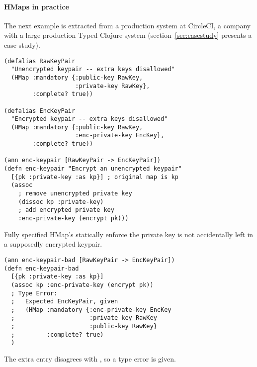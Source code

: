 \paragraph{HMaps in practice} The next example is extracted from a production system at CircleCI,
a company with a large production Typed Clojure system
(section~\ref{sec:casestudy} presents a case study).

\begin{verbatim}
(defalias RawKeyPair
  "Unencrypted keypair -- extra keys disallowed"
  (HMap :mandatory {:public-key RawKey,
                    :private-key RawKey},
        :complete? true))

(defalias EncKeyPair
  "Encrypted keypair -- extra keys disallowed"
  (HMap :mandatory {:public-key RawKey,
                    :enc-private-key EncKey},
        :complete? true))

(ann enc-keypair [RawKeyPair -> EncKeyPair])
(defn enc-keypair "Encrypt an unencrypted keypair"
  [{pk :private-key :as kp}] ; original map is kp
  (assoc 
    ; remove unencrypted private key
    (dissoc kp :private-key)
    ; add encrypted private key
    :enc-private-key (encrypt pk)))
\end{verbatim}
Fully specified HMap's
statically enforce the private key is not accidentally left in a supposedly
encrypted keypair.

\begin{verbatim}
(ann enc-keypair-bad [RawKeyPair -> EncKeyPair])
(defn enc-keypair-bad
  [{pk :private-key :as kp}]
  (assoc kp :enc-private-key (encrypt pk))
  ; Type Error:
  ;   Expected EncKeyPair, given 
  ;   (HMap :mandatory {:enc-private-key EncKey
  ;                     :private-key RawKey
  ;                     :public-key RawKey}
  ;         :complete? true)
  )
\end{verbatim}

The extra  entry disagrees with , so a type error
is given.


